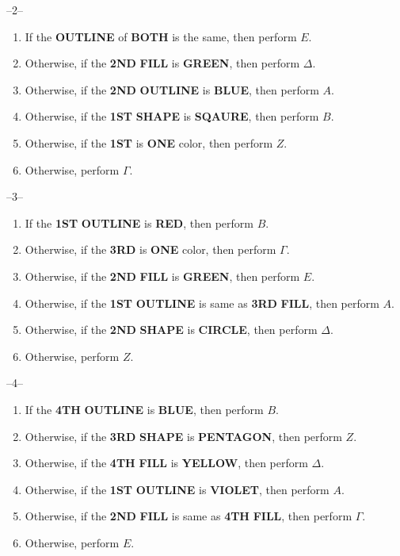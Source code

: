 \documentclass[letterpaper,12pt]{report}
\begin{document}
\vspace{1cm}
\begin{center}
  --2--
  \begin{enumerate}
    \item If the \textbf{OUTLINE} of \textbf{BOTH} is the same, then perform $E$.
    \item Otherwise, if the \textbf{2ND} \textbf{FILL} is \textbf{GREEN}, then perform $\Delta$.
    \item Otherwise, if the \textbf{2ND} \textbf{OUTLINE} is \textbf{BLUE}, then perform $A$.
    \item Otherwise, if the \textbf{1ST} \textbf{SHAPE} is \textbf{SQAURE}, then perform $B$.
    \item Otherwise, if the \textbf{1ST} is \textbf{ONE} color, then perform $Z$.
    \item Otherwise, perform $\Gamma$.
  \end{enumerate}
\end{center}
\begin{center}
  --3--
  \begin{enumerate}
    \item If the \textbf{1ST} \textbf{OUTLINE} is \textbf{RED}, then perform $B$.
    \item Otherwise, if the \textbf{3RD} is \textbf{ONE} color, then perform $\Gamma$.
    \item Otherwise, if the \textbf{2ND} \textbf{FILL} is \textbf{GREEN}, then perform $E$.
    \item Otherwise, if the \textbf{1ST} \textbf{OUTLINE} is same as \textbf{3RD} \textbf{FILL}, then perform $A$.
    \item Otherwise, if the \textbf{2ND} \textbf{SHAPE} is \textbf{CIRCLE}, then perform $\Delta$.
    \item Otherwise, perform $Z$.
  \end{enumerate}
\end{center}
\begin{center}
  --4--
  \begin{enumerate}
    \item If the \textbf{4TH} \textbf{OUTLINE} is \textbf{BLUE}, then perform $B$.
    \item Otherwise, if the \textbf{3RD} \textbf{SHAPE} is \textbf{PENTAGON}, then perform $Z$.
    \item Otherwise, if the \textbf{4TH} \textbf{FILL} is \textbf{YELLOW}, then perform $\Delta$.
    \item Otherwise, if the \textbf{1ST} \textbf{OUTLINE} is \textbf{VIOLET}, then perform $A$.
    \item Otherwise, if the \textbf{2ND} \textbf{FILL} is same as \textbf{4TH} \textbf{FILL}, then perform $\Gamma$.
    \item Otherwise, perform $E$.
  \end{enumerate}
\end{center}
\pagebreak
\end{document}
